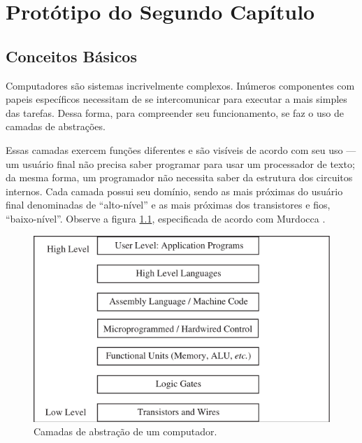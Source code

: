 \chapter{Protótipo do Segundo Capítulo}

\section{Conceitos Básicos}


Computadores são sistemas incrivelmente complexos. Inúmeros componentes com
papeis específicos necessitam de se intercomunicar para executar a mais simples das
tarefas. Dessa forma, para compreender seu funcionamento, se faz o uso de
camadas de abstrações.

Essas camadas exercem funções diferentes e são visíveis de acordo com seu uso
--- um usuário final não precisa saber programar para usar um processador de
texto; da mesma forma, um programador não necessita saber da estrutura dos
circuitos internos. Cada camada possui seu domínio, sendo as mais próximas do
usuário final denominadas de ``alto-nível'' e as mais próximas dos transistores
e fios, ``baixo-nível''. Observe a figura \ref{camadas}, especificada de acordo
com Murdocca \cite{principles}.

\begin{figure}[ptb]
  \begin{center}
    \includegraphics[scale=.6]{imagens/1_camadas}
  \end{center}
  \caption{Camadas de abstração de um computador.}
  \label{camadas}
\end{figure}


